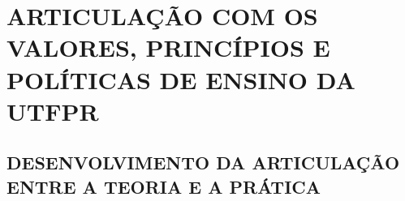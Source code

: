 \chapter{ARTICULAÇÃO COM OS VALORES, PRINCÍPIOS E POLÍTICAS DE ENSINO DA UTFPR}

\section{DESENVOLVIMENTO DA ARTICULAÇÃO ENTRE A TEORIA E A PRÁTICA}

